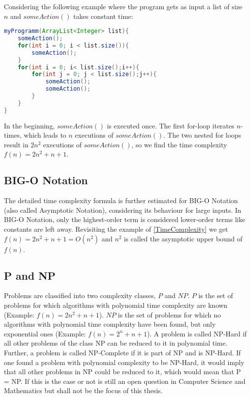 Considering the following example where the program gets as input a list of size $n$ and $someAction()$ takes constant time:
\lstset{basicstyle=\ttfamily}
\begin{lstlisting}[language=java,frame=single]
myProgramm(ArrayList<Integer> list){
    someAction();
    for(int i = 0; i < list.size()){
        someAction();
    }
    for(int i = 0; i< list.size();i++){
        for(int j = 0; j < list.size();j++){
            someAction();
            someAction();
        }
    }
}
\end{lstlisting}
In the beginning, $someAction()$ is executed once. The first for-loop iterates $n$-times, which leads to $n$ executions of $someAction()$. The two nested for loops result in $2n^2$ executions of $someAction()$, so we find the time complexity $f(n)=2n^2+n+1$.

\subsection{BIG-O Notation}
The detailed time complexity formula is further estimated for BIG-O Notation (also called Asymptotic Notation), considering its behaviour for large inputs. In BIG-O Notation, only the highest-order term is considered lower-order terms like constants are left away. Revisiting the example of \ref{TimeComplexity} we get $f(n) = 2n^2+n+1 = O(n^2)$ and $n^2$ is called the asymptotic upper bound of $f(n)$.

\subsection{P and NP}
Problems are classified into two complexity classes, $P$ and $NP$. $P$ is the set of problems for which algorithms with polynomial time complexity are known (Example: $f(n)=2n^2+n+1$). $NP$ is the set of problems for which no algorithms with polynomial time complexity have been found, but only exponential ones (Example: $f(n)=2^n+n+1$). A problem is called NP-Hard if all other problems of the class NP can be reduced to it in polynomial time. Further, a problem is called NP-Complete if it is part of NP and is NP-Hard. If one found a problem with polynomial complexity to be NP-Hard, it would imply that all other problems in NP could be reduced to it, which would mean that P = NP. If this is the case or not is still an open question in Computer Science and Mathematics but shall not be the focus of this thesis.
